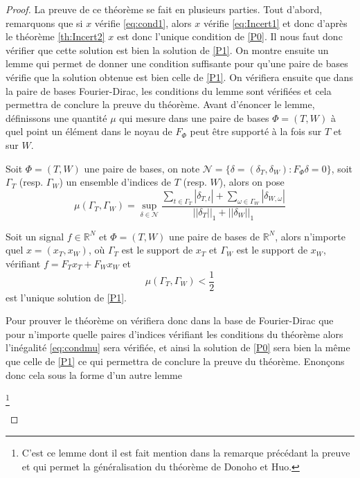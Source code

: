 \begin{proof}
	La preuve de ce théorème se fait en plusieurs parties.
	Tout d'abord, remarquons que si $x$ vérifie \ref{eq:cond1}, alors $x$ vérifie \ref{eq:Incert1} et donc d'après le théorème \ref{th:Incert2} $x$ est donc l'unique condition de \ref{P0}.
	Il nous faut donc vérifier que cette solution est bien la solution de \ref{P1}.
	On montre ensuite un lemme qui permet de donner une condition suffisante pour qu'une paire de bases vérifie que la solution obtenue est bien celle de \ref{P1}.
	On vérifiera ensuite que dans la paire de bases Fourier-Dirac, les conditions du lemme sont vérifiées et cela permettra de conclure la preuve du théorème.
	Avant d'énoncer le lemme, définissons une quantité $\mu$ qui mesure dans une paire de bases $\Phi=(T,W)$ à quel point un élément dans le noyau de $F_\Phi$ peut être supporté à la fois sur $T$ et sur $W$.
	\begin{definition}
		Soit $\Phi = (T,W)$ une paire de bases, on note $\mathcal{N} = \{\delta = (\delta_T, \delta_W): F_\Phi \delta = 0\}$, soit $\Gamma_T$ (resp. $\Gamma_W$) un ensemble d'indices de $T$ (resp. $W$), alors on pose
		\begin{equation}
			\mu(\Gamma_T, \Gamma_W) = \sup_{\delta \in \mathcal{N}} \frac{\sum_{t \in \Gamma_T} |\delta_{T,t}| + \sum_{\omega \in \Gamma_W} |\delta_{W,\omega}|  }{||\delta_T||_1 + ||\delta_W||_1 }
		\end{equation}
	\end{definition}
	\begin{lemme}\label{th:muP1}
		Soit un signal $f \in \mathbb{R}^N$ et $\Phi=(T,W)$ une paire de bases de $\mathbb{R}^N$, alors n'importe quel $x = (x_T, x_W)$, où $\Gamma_T$ est le support de $x_T$ et $\Gamma_W$ est le support de $x_W$, 	vérifiant $f = F_T x_T + F_W x_W$ et
		\begin{equation}\label{eq:condmu}
			\mu(\Gamma_T, \Gamma_W) < \frac{1}{2}
		\end{equation}
		est l'unique solution de \ref{P1}.
	\end{lemme}
	Pour prouver le théorème on vérifiera donc dans la base de Fourier-Dirac que pour n'importe quelle paires d'indices vérifiant les conditions du théorème alors l'inégalité \ref{eq:condmu} sera vérifiée, et ainsi la solution de \ref{P0} sera bien la même que celle de \ref{P1} ce qui permettra de conclure la preuve du théorème.
	Enonçons donc cela sous la forme d'un autre lemme
	\begin{lemme}\label{th:muFD}\footnote{C'est ce lemme dont il est fait mention dans la remarque précédant la preuve et qui permet la généralisation du théorème de Donoho et Huo.}

\end{lemme}
\end{proof}
